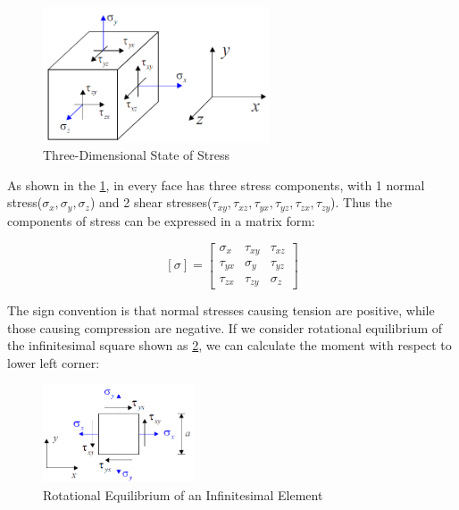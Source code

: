 \documentclass[en,hazy,cyan,8pt,normal]{elegantnote}
\begin{document}
    \begin{figure}[H]
      \centering
      \includegraphics[width=0.6\textwidth]{image/003.png}
      \caption{Three-Dimensional State of Stress}
      \label{fig:003}
    \end{figure}

    As shown in the \cref{fig:003}, in every face has three stress components, with 1 normal stress($\sigma_x, \sigma_y, \sigma_z$) and 2 shear stresses($\tau_{xy}, \tau_{xz}, \tau_{yx}, \tau_{yz}, \tau_{zx}, \tau_{zy}$). Thus the components of stress can be expressed in a matrix form:

    \begin{equation}\label{eq:003}
      [\sigma]=
      \begin{bmatrix}
        \sigma_x & \tau_{xy} & \tau_{xz}\\
        \tau_{yx} & \sigma_y & \tau_{yz}\\
        \tau_{zx} & \tau_{zy} & \sigma_z
      \end{bmatrix}
    \end{equation}

    The sign convention is that normal stresses causing tension are positive, while those causing compression are negative.
    If we consider rotational equilibrium of the infinitesimal square shown as \cref{fig:004}, we can calculate the moment with respect to lower left corner:

    \begin{figure}[H]
      \centering
      \includegraphics[width=0.4\textwidth]{image/004.png}
      \caption{Rotational Equilibrium of an Infinitesimal Element}
      \label{fig:004}
    \end{figure}
\end{document}

